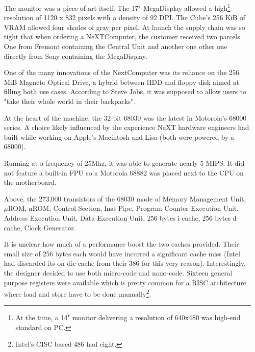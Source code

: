 The monitor was a piece of art itself. The 17" MegaDisplay allowed a high\footnote{At the time, a 14" monitor delivering a resolution of 640x480 was high-end standard on PC.} resolution of 1120 x 832 pixels with a density of 92 DPI. The Cube's 256 KiB of VRAM allowed four shades of gray per pixel. At launch the supply chain was so tight that when ordering a NeXTComputer, the customer received two parcels. One from Fremont containing the Central Unit and another one  other one directly from Sony containing the MegaDisplay.





\begin{figure}[H]
\centering
{}
\end{figure}
\par
One of the many innovations of the NextComputer was its reliance on the 256 MiB Magneto Optical Drive, a hybrid between HDD and floppy disk aimed at filling both use cases. According to Steve Jobs, it was supposed to allow users to "take their whole world in their backpacks".\\
\par
At the heart of the machine, the 32-bit 68030 was the latest in Motorola's 68000 series. A choice likely influenced by the experience NeXT hardware engineers had built while working on Apple's Macintosh and Lisa (both were powered by a 68000).\\
\par
 Running at a frequency of 25Mhz, it was able to generate nearly 5 MIPS. It did not feature a built-in FPU so a Motorola 68882 was placed next to the CPU on the motherboard. %



\begin{figure}[H]
\centering
{}
\end{figure}
\par
\vspace{-3mm}
Above, the 273,000 transistors of the 68030 made of  Memory Management Unit,  $\mu$ROM,  nROM,  Control Section,  Inst Pipe,  Program Counter Execution Unit,  Address Execution Unit,  Data Execution Unit,  256 bytes i-cache,  256 bytes d-cache,  Clock Generator.\\         
\par
It is unclear how much of a performance boost the two caches provided. Their small size of 256 bytes each would have incurred a significant cache miss (Intel had discarded its on-die cache from their 386 for this very reason). Interestingly, the designer decided to use both micro-code and nano-code. Sixteen general purpose registers were available which is pretty common for a RISC architecture where load and store have to be done manually\footnote{Intel's CISC based 486 had eight.}.
\pagebreak
 


